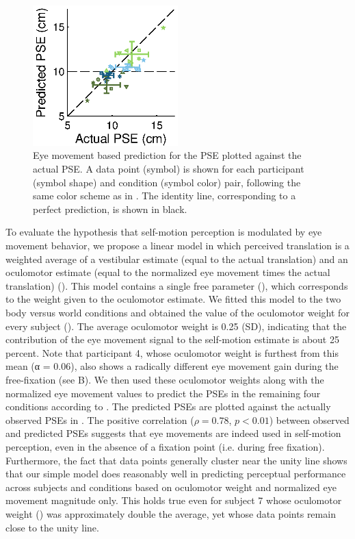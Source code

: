 \begin{figure}
    \includegraphics[width=0.5\textwidth]{src/paper3/figure4.eps}

    \caption{Eye movement based prediction for the PSE plotted against the actual PSE.  A data point (symbol) is shown for each participant (symbol shape) and condition (symbol color) pair, following the same color scheme as in . The identity line, corresponding to a perfect prediction, is shown in black.}
    \label{p3:fig4}    
\end{figure}

To evaluate the hypothesis that self-motion perception is modulated by eye movement behavior, we propose a linear model in which perceived translation is a weighted average of a vestibular estimate (equal to the actual translation) and an oculomotor estimate (equal to the normalized eye movement times the actual translation) (). This model contains a single free parameter (), which corresponds to the weight given to the oculomotor estimate. We fitted this model to the two body versus world conditions and obtained the value of the oculomotor weight for every subject (). The average oculomotor weight is 0.25  (SD), indicating that the contribution of the eye movement signal to the self-motion estimate is about 25 percent. Note that participant 4, whose oculomotor weight is furthest from this mean (α = 0.06), also shows a radically different eye movement gain during the free-fixation (see B). We then used these oculomotor weights along with the normalized eye movement values to predict the PSEs in the remaining four conditions according to . The predicted PSEs are plotted against the actually observed PSEs in . The positive correlation ($\rho = 0.78$, $p < 0.01$) between observed and predicted PSEs suggests that eye movements are indeed used in self-motion perception, even in the absence of a fixation point (i.e. during free fixation). Furthermore, the fact that data points generally cluster near the unity line shows that our simple model does reasonably well in predicting perceptual performance across subjects and conditions based on oculomotor weight and normalized eye movement magnitude only. This holds true even for subject 7 whose oculomotor weight () was approximately double the average, yet whose data points remain close to the unity line.
